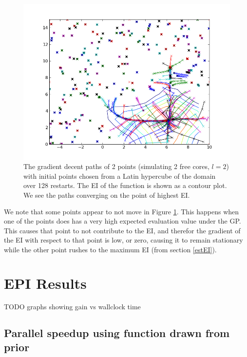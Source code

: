 \documentclass[phd,tocprelim]{cornell}
\begin{document}
\begin{figure}[hpt]
 	\centerline{\includegraphics[width=\textwidth]{figures/EPI/branin_2d_32pk_paths_and_EI.png}}
    \caption[Gradient decent paths in Branin Function]{The gradient decent paths of 2 points (simulating 2 free cores, $l=2$) with initial points chosen from a Latin hypercube of the domain over 128 restarts. The EI of the function is shown as a contour plot. We see the paths converging on the point of highest EI.}
 	\label{fig:pk_paths}
 \end{figure}

 We note that some points appear to not move in Figure \ref{fig:pk_paths}. This happens when one of the points does has a very high expected evaluation value under the GP. This causes that point to not contribute to the EI, and therefor the gradient of the EI with respect to that point is low, or zero, causing it to remain stationary while the other point rushes to the maximum EI (from section \ref{estEI}).



\chapter{EPI Results} %
\label{cha:EPI Results}

TODO graphs showing gain vs wallclock time

\section{Parallel speedup using function drawn from prior}
\end{document}
